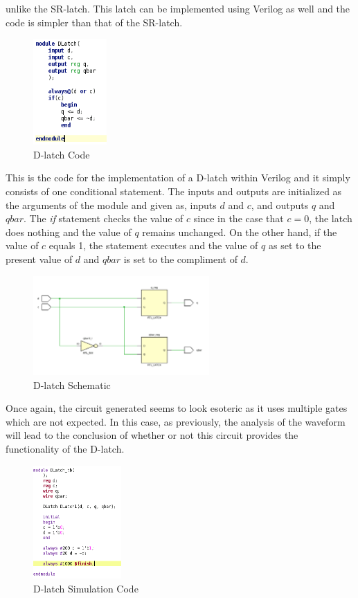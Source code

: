 \documentclass[12pt]{article}
\begin{document}
    unlike the SR-latch. This latch can be implemented using Verilog as well and
    the code is simpler than that of the SR-latch.
    \begin{figure}[h]
        \centering
        \includegraphics[width=0.25\textwidth]{DLatch Code.png}
        \caption{D-latch Code}
    \end{figure}
    \par This is the code for the implementation of a D-latch within Verilog and
    it simply consists of one conditional statement. The inputs and outputs are
    initialized as the arguments of the module and given as, inputs $d$ and $c$,
    and outputs $q$ and $qbar$. The \textit{if} statement checks the value of
    $c$ since in the case that $c = 0$, the latch does nothing and the value of
    $q$ remains unchanged. On the other hand, if the value of $c$ equals 1, the
    statement executes and the value of $q$ as set to the present value of $d$
    and $qbar$ is set to the compliment of $d$.
    \begin{figure}[h]
        \centering
        \includegraphics[width=0.6\textwidth]{DLatch Schematic.png}
        \caption{D-latch Schematic}
    \end{figure}
    \par Once again, the circuit generated seems to look esoteric as it uses
    multiple gates which are not expected. In this case, as previously, the
    analysis of the waveform will lead to the conclusion of whether or not this
    circuit provides the functionality of the D-latch.
    \begin{figure}[h]
        \centering
        \includegraphics[width=0.3\textwidth]{DLatch Simulation Code.png}
        \caption{D-latch Simulation Code}
    \end{figure}
\end{document}
